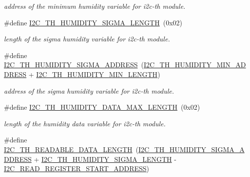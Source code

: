 \begin{DoxyCompactItemize}
\begin{DoxyCompactList}\small\item\em address of the minimum humidity variable for i2c-\/th module. \end{DoxyCompactList}\item 
\mbox{\label{registers-th_8h_ac845881a1c5e3caa152724619e298044}} 
\#define \hyperlink{registers-th_8h_ac845881a1c5e3caa152724619e298044}{I2\+C\+\_\+\+T\+H\+\_\+\+H\+U\+M\+I\+D\+I\+T\+Y\+\_\+\+S\+I\+G\+M\+A\+\_\+\+L\+E\+N\+G\+TH}~(0x02)
\begin{DoxyCompactList}\small\item\em length of the sigma humidity variable for i2c-\/th module. \end{DoxyCompactList}\item 
\mbox{\label{registers-th_8h_a79c69759f7f0b6db1938a786d214296f}} 
\#define \hyperlink{registers-th_8h_a79c69759f7f0b6db1938a786d214296f}{I2\+C\+\_\+\+T\+H\+\_\+\+H\+U\+M\+I\+D\+I\+T\+Y\+\_\+\+S\+I\+G\+M\+A\+\_\+\+A\+D\+D\+R\+E\+SS}~(\hyperlink{registers-th_8h_a707f2aa68826eec93b19e8426ab86d02}{I2\+C\+\_\+\+T\+H\+\_\+\+H\+U\+M\+I\+D\+I\+T\+Y\+\_\+\+M\+I\+N\+\_\+\+A\+D\+D\+R\+E\+SS} + \hyperlink{registers-th_8h_a7f9d59a93a51fa58d1fa0fc389a2ff93}{I2\+C\+\_\+\+T\+H\+\_\+\+H\+U\+M\+I\+D\+I\+T\+Y\+\_\+\+M\+I\+N\+\_\+\+L\+E\+N\+G\+TH})
\begin{DoxyCompactList}\small\item\em address of the sigma humidity variable for i2c-\/th module. \end{DoxyCompactList}\item 
\mbox{\label{registers-th_8h_a0c76a423b5e600174e4b6502f6f19762}} 
\#define \hyperlink{registers-th_8h_a0c76a423b5e600174e4b6502f6f19762}{I2\+C\+\_\+\+T\+H\+\_\+\+H\+U\+M\+I\+D\+I\+T\+Y\+\_\+\+D\+A\+T\+A\+\_\+\+M\+A\+X\+\_\+\+L\+E\+N\+G\+TH}~(0x02)
\begin{DoxyCompactList}\small\item\em length of the humidity data variable for i2c-\/th module. \end{DoxyCompactList}\item 
\mbox{\label{registers-th_8h_a1ffb1262654d227edede5e899883291e}} 
\#define \hyperlink{registers-th_8h_a1ffb1262654d227edede5e899883291e}{I2\+C\+\_\+\+T\+H\+\_\+\+R\+E\+A\+D\+A\+B\+L\+E\+\_\+\+D\+A\+T\+A\+\_\+\+L\+E\+N\+G\+TH}~(\hyperlink{registers-th_8h_a79c69759f7f0b6db1938a786d214296f}{I2\+C\+\_\+\+T\+H\+\_\+\+H\+U\+M\+I\+D\+I\+T\+Y\+\_\+\+S\+I\+G\+M\+A\+\_\+\+A\+D\+D\+R\+E\+SS} + \hyperlink{registers-th_8h_ac845881a1c5e3caa152724619e298044}{I2\+C\+\_\+\+T\+H\+\_\+\+H\+U\+M\+I\+D\+I\+T\+Y\+\_\+\+S\+I\+G\+M\+A\+\_\+\+L\+E\+N\+G\+TH} -\/ \hyperlink{registers_8h_ad04d1b7c138bbfcc7672f00defb5f312}{I2\+C\+\_\+\+R\+E\+A\+D\+\_\+\+R\+E\+G\+I\+S\+T\+E\+R\+\_\+\+S\+T\+A\+R\+T\+\_\+\+A\+D\+D\+R\+E\+SS})

\end{DoxyCompactItemize}
